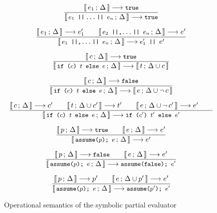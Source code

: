 \documentclass[a4paper,twoside]{article}
\newcommand{\lb}[2]{\llbracket\, #1\,;\, #2\, \rrbracket}
\newcommand{\stt}[1]{\texttt{\small{#1}}}
\begin{document}
\begin{figure}[htb]
\begin{framed}
\begin{equation}
\dfrac{
  \lb{e_1}{\Delta} \longrightarrow \stt{true}
}{
  \lb{\stt{$e_1$ ||\,\ldots\,|| $e_n$}}{\Delta} \longrightarrow \stt{true}
}
\end{equation}

\begin{equation}
\dfrac{
  \lb{e_1}{\Delta} \longrightarrow e_1' \qquad
  \lb{\stt{$e_2$ ||,\ldots\,|| $e_n$}}{\Delta} \longrightarrow e'
}{
  \lb{\stt{$e_1$ ||,\ldots\,|| $e_n$}}{\Delta} \longrightarrow \stt{$e_1'$ || } e'
}
\end{equation}

\begin{equation}
\dfrac{
  \lb{c}{\Delta} \longrightarrow \stt{true}
}{
  \lb{\stt{if ($c$) $t$ else $e$}}{\Delta} \longrightarrow \lb{t}{\Delta \cup c}
}
\end{equation}

\begin{equation}
\dfrac{
  \lb{c}{\Delta} \longrightarrow \stt{false}
}{
  \lb{\stt{if ($c$) $t$ else $e$}}{\Delta} \longrightarrow \lb{e}{\Delta \cup \neg \,c}
}
\end{equation}


\begin{equation}
\dfrac{
  \lb{c}{\Delta} \longrightarrow c' \qquad
  \lb{t}{\Delta \cup c'} \longrightarrow t' \qquad
  \lb{e}{\Delta \cup \neg\, c'} \longrightarrow e' \qquad
}{
  \lb{\stt{if ($c$) $t$ else $e$}}{\Delta} \longrightarrow \stt{if ($c'$) $t'$ else $e'$}
}
\end{equation}

\begin{equation}
\dfrac{
  \lb{p}{\Delta} \longrightarrow \stt{true} \qquad
  \lb{e}{\Delta} \longrightarrow e'
}{
  \lb{\stt{assume($p$); $e$}}{\Delta} \longrightarrow e'
}
\end{equation}

\begin{equation}
\dfrac{
  \lb{p}{\Delta} \longrightarrow \stt{false} \qquad
  \lb{e}{\Delta} \longrightarrow e'
}{
  \lb{\stt{assume($p$); $e$}}{\Delta} \longrightarrow \stt{assume(false); $e'$}
}
\end{equation}

\begin{equation}
\dfrac{
  \lb{p}{\Delta} \longrightarrow p' \qquad
  \lb{e}{\Delta \cup p'} \longrightarrow e'
}{
  \lb{\stt{assume($p$); $e$}}{\Delta} \longrightarrow
  \stt{assume($p'$); $e'$}
}
\end{equation}

\end{framed}
\vspace{-10pt}
\caption{Operational semantics of the symbolic partial evaluator \label{fig:symbolicsem}}
\end{figure}
\end{document}
